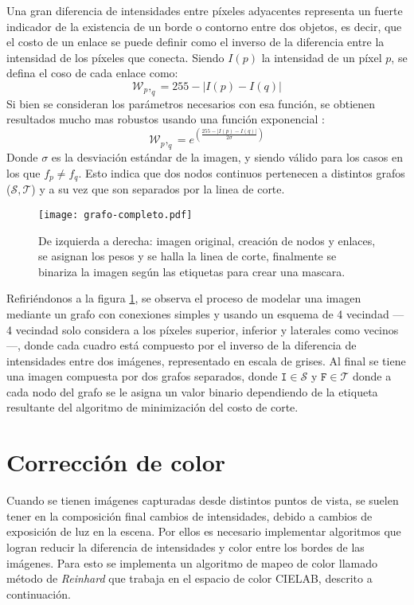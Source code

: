 Una gran diferencia de intensidades entre píxeles adyacentes representa un fuerte indicador de la existencia de un borde o contorno entre dos objetos, es decir, que el costo de un enlace se puede definir como el inverso de la diferencia entre la intensidad de los píxeles que conecta. Siendo $I(p)$ la intensidad de un píxel $p$, se defina el coso de cada enlace como:
\begin{equation}
\mathcal{W}_p,_q = 255 - |I(p) - I (q)|
\label{costo-corte}
\end{equation}
Si bien se consideran los parámetros necesarios con esa función, se obtienen resultados mucho mas robustos usando una función exponencial \cite{graph-opencv}:
\begin{equation}
\mathcal{W}_p,_q = e^{\left(\frac{255-|I(p) - I (q)|}{2 \sigma}  \right) }
\label{costo-corte}
\end{equation}
Donde $\sigma$ es la desviación estándar de la imagen, y siendo válido para los casos en los que $f_p \neq f_q$. Esto indica que dos nodos continuos pertenecen a distintos grafos ($\mathcal{S,T}$) y a su vez que son separados por la linea de corte.

\begin{figure}[h]
	\centering
	\texttt{[image: grafo-completo.pdf]}
	\caption[Corte por grafo]{De izquierda a derecha: imagen original, creación de nodos y enlaces, se asignan los pesos y se halla la linea de corte, finalmente se binariza la imagen según las etiquetas para crear una mascara.}
	\label{imagen:grafo}
\end{figure}

Refiriéndonos a la figura \ref{imagen:grafo}, se observa el proceso de modelar una imagen mediante un grafo con conexiones simples y usando un esquema de 4 vecindad --- 4 vecindad solo considera a los píxeles superior, inferior y laterales como vecinos ---, donde cada cuadro está compuesto por el inverso de la diferencia de intensidades entre dos imágenes, representado en escala de grises. Al final se tiene una imagen compuesta por dos grafos separados, donde $\mathtt{I} \in \mathcal{S}$ y $\mathtt{F} \in \mathcal{T}$ donde a cada nodo del grafo se le asigna un valor binario dependiendo de la etiqueta resultante del algoritmo de minimización del costo de corte.


\section{Corrección de color}\label{seccion-color}
Cuando se tienen imágenes capturadas desde distintos puntos de vista, se suelen tener en la composición final cambios de intensidades, debido a cambios de exposición de luz en la escena. Por ellos es necesario implementar algoritmos que logran reducir la diferencia de intensidades y color entre los bordes de las imágenes. Para esto se implementa un algoritmo de mapeo de color llamado método de \textit{Reinhard} \cite{reinhard} que trabaja en el espacio de color CIELAB, descrito a continuación. 

